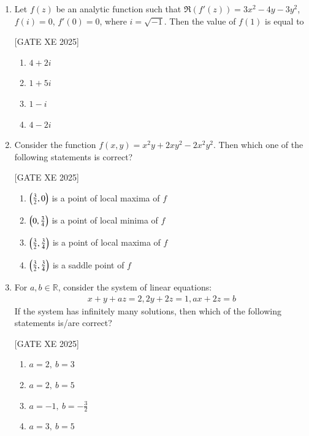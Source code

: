 \documentclass[journal,12pt,onecolumn]{IEEEtran}
\theoremstyle{remark}
\begin{document}
\begin{enumerate}
\hfill [GATE XE 2025]

\item Let $f(z)$ be an analytic function such that $\Re(f'(z)) = 3x^2-4y-3y^2$, $f(i)=0$, $f'(0)=0$, where $i=\sqrt{-1}$.  
Then the value of $f(1)$ is equal to

\hfill [GATE XE 2025]

\begin{multicols}{2}
\begin{enumerate}
\item $4+2i$
\item $1+5i$
\item $1-i$
\item $4-2i$
\end{enumerate}
\end{multicols}

\item Consider the function $f(x,y) = x^2y + 2xy^2 - 2x^2y^2$.  
Then which one of the following statements is correct?

\hfill [GATE XE 2025]

\begin{multicols}{2}
\begin{enumerate}
\item $\left(\tfrac{3}{2},0\right)$ is a point of local maxima of $f$
\item $\left(0,\tfrac{3}{4}\right)$ is a point of local minima of $f$
\item $\left(\tfrac{3}{2},\tfrac{3}{4}\right)$ is a point of local maxima of $f$
\item $\left(\tfrac{3}{2},\tfrac{3}{4}\right)$ is a saddle point of $f$
\end{enumerate}
\end{multicols}

\item For $a,b \in \mathbb{R}$, consider the system of linear equations:  
\begin{align}
x+y+az=2,  2y+2z=1,  ax+2z=b
\end{align}  
If the system has infinitely many solutions, then which of the following statements is/are correct?

\hfill [GATE XE 2025]

\begin{multicols}{2}
\begin{enumerate}
\item $a=2,\ b=3$
\item $a=2,\ b=5$
\item $a=-1,\ b=-\tfrac{3}{2}$
\item $a=3,\ b=5$
\end{enumerate}
\end{multicols}


\end{enumerate}
\end{document}
